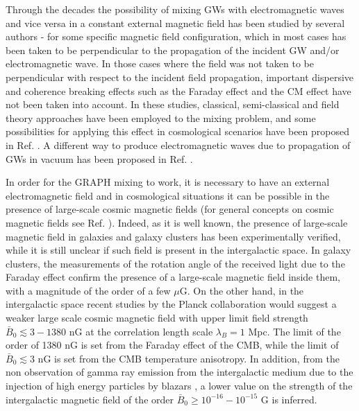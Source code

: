 \documentclass[a4paper,11pt]{article}
\begin{document}
 
 Through the decades the possibility of mixing GWs with electromagnetic waves and vice versa in a constant external magnetic field has been studied by several authors \cite{Boccaletti70}-\cite{Bastianelli05} for some specific magnetic field configuration, which in most cases has been taken to be perpendicular to the propagation of the incident GW and/or electromagnetic wave. In those cases where the field was not taken to be perpendicular with respect to the incident field propagation, important dispersive and coherence breaking effects such as the Faraday effect and the CM effect have not been taken into account. In these studies, classical, semi-classical \cite{Boccaletti70} and field theory approaches \cite{Bastianelli05} have been employed to the mixing problem, and some possibilities for applying this effect in cosmological scenarios have been proposed in Ref. \cite{Dolgov:2012be}. A different way to produce electromagnetic waves due to propagation of GWs in vacuum has been proposed in Ref. \cite{Jones:2017dzt}. 
 
 
 In order for the GRAPH mixing to work, it is necessary to have an external electromagnetic field and in cosmological situations it can be possible in the presence of large-scale cosmic magnetic fields (for general concepts on cosmic magnetic fields see Ref. \cite{Grasso:2000wj}).  Indeed, as it is well known, the presence of large-scale magnetic field in galaxies and galaxy clusters has been experimentally verified, while it is still unclear if such field is present in the intergalactic space. In galaxy clusters, the measurements of the rotation angle of the received light due to the Faraday effect confirm the presence of a large-scale magnetic field inside them, with a magnitude of the order of a few $\mu$G. On the other hand, in the intergalactic space recent studies by the Planck collaboration \cite{Ade:2015cva} would suggest a weaker large scale cosmic magnetic field with upper limit field strength $\bar B_0 \lesssim 3 - 1380$ nG at the correlation length scale $\lambda_B=1$ Mpc. The limit of the order of 1380 nG is set from the Faraday effect of the CMB, while the limit of $\bar B_0\lesssim 3$ nG is set from the CMB temperature anisotropy. In addition, from the non observation of gamma ray emission from the intergalactic medium due to the injection of high energy particles by blazars \cite{Neronov:1900zz}, a lower value on the strength of the intergalactic magnetic field of the order  $\bar B_0\geq 10^{-16}-10^{-15}$ G is inferred.
 
 
 
\end{document}

